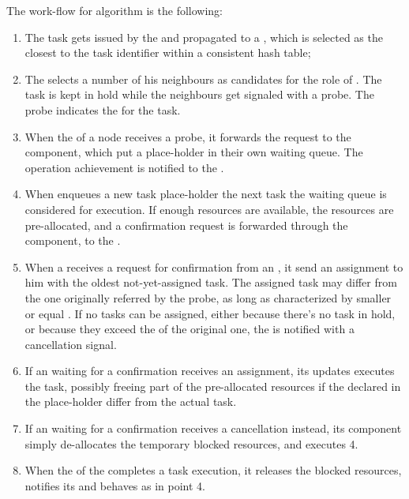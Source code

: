 \documentclass[conference]{IEEEtran}
\begin{document}
  The work-flow for \us algorithm is the following:

  \begin{enumerate}

    \item The task gets issued by the \dc and propagated to a \tmast,
      which is selected as the closest to the task identifier within a
      consistent hash table;

    \item The \tmast selects a number of his neighbours as candidates for
      the role of \exc. The task is kept in hold while the neighbours get
      signaled with a probe. The probe indicates the \treq for the task.

    \item When the \ResourceManager of a node receives a probe, it
      forwards the request to the \RmWorker component, which put a
      place-holder in their own waiting queue. The operation achievement
      is notified to the \tmast.

    \item When \RmWorker enqueues a new task place-holder the next task
      the waiting queue is considered for execution. If enough resources
      are available, the \treq resources are pre-allocated, and a
      confirmation request is forwarded through the \ResourceManager
      component, to the \tmast.

    \item When a \tmast receives a request for confirmation from an \exc,
      it send an assignment to him with the oldest not-yet-assigned task.
      The assigned task may differ from the one originally referred by the
      probe, as long as characterized by smaller or equal \treq. If
      no tasks can be assigned, either because there's no task in hold, or
      because they exceed the \treq of the original one, the \exc is
      notified with a cancellation signal.

    \item If an \exc waiting for a confirmation receives an assignment,
      its \RmWorker updates executes the task, possibly freeing part of
      the pre-allocated resources if the \treq declared in the
      place-holder differ from the actual task.

    \item If an \exc waiting for a confirmation receives a cancellation
      instead, its \RmWorker component simply de-allocates the temporary
      blocked resources, and executes 4.

    \item When the \RmWorker of the \exc completes a task execution, it
      releases the blocked resources, notifies its \ResourceManager and
      behaves as in point 4.

  \end{enumerate}
\end{document}
